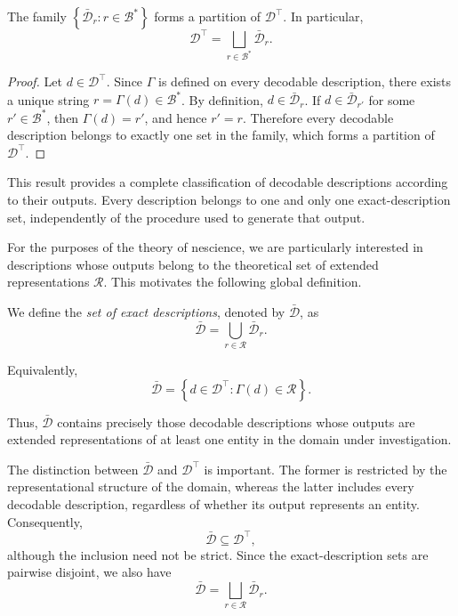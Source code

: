 \begin{proposition}
\label{prop:exact_descriptions_partition}
The family $\left\{\bar{\mathcal{D}}_r:r\in\mathcal{B}^\ast\right\}$ forms a partition of $\mathcal{D}^\top$. In particular,
\[
\mathcal{D}^\top = \bigsqcup_{r\in\mathcal{B}^\ast} \bar{\mathcal{D}}_r.
\]
\end{proposition}
\begin{proof}
Let $d\in\mathcal{D}^\top$. Since $\Gamma$ is defined on every decodable description, there exists a unique string $r=\Gamma(d)\in\mathcal{B}^\ast$. By definition, $d\in\bar{\mathcal{D}}_r$. If $d\in\bar{\mathcal{D}}_{r'}$ for some $r'\in\mathcal{B}^\ast$, then $\Gamma(d)=r'$, and hence $r'=r$. Therefore every decodable description belongs to exactly one set in the family, which forms a partition of $\mathcal{D}^\top$.
\end{proof}

This result provides a complete classification of decodable descriptions according to their outputs. Every description belongs to one and only one exact-description set, independently of the procedure used to generate that output.

For the purposes of the theory of nescience, we are particularly interested in descriptions whose outputs belong to the theoretical set of extended representations $\mathcal{R}$. This motivates the following global definition.

\begin{definition}
\label{def:set_of_exact_descriptions}
We define the \emph{set of exact descriptions}, denoted by $\bar{\mathcal{D}}$, as
\[
\bar{\mathcal{D}} = \bigcup_{r\in\mathcal{R}} \bar{\mathcal{D}}_r.
\]
\end{definition}

\noindent
Equivalently,
\[
\bar{\mathcal{D}} = \left\{d\in\mathcal{D}^\top:\Gamma(d)\in\mathcal{R}\right\}.
\]

Thus, $\bar{\mathcal{D}}$ contains precisely those decodable descriptions whose outputs are extended representations of at least one entity in the domain under investigation.

The distinction between $\bar{\mathcal{D}}$ and $\mathcal{D}^\top$ is important. The former is restricted by the representational structure of the domain, whereas the latter includes every decodable description, regardless of whether its output represents an entity. Consequently,
\[
\bar{\mathcal{D}}\subseteq\mathcal{D}^\top,
\]
although the inclusion need not be strict. Since the exact-description sets are pairwise disjoint, we also have
\[
\bar{\mathcal{D}}
=
\bigsqcup_{r\in\mathcal{R}}
\bar{\mathcal{D}}_r.
\]

